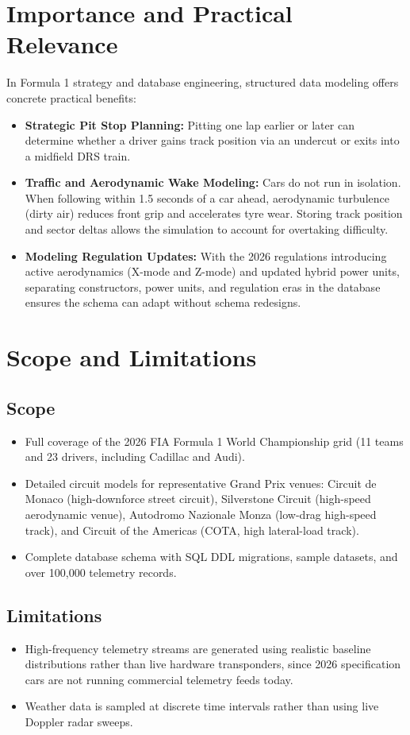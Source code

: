 \documentclass[12pt,a4paper]{report}
\begin{document}
\section{Importance and Practical Relevance}
In Formula 1 strategy and database engineering, structured data modeling offers concrete practical benefits:
\begin{itemize}
    \item \textbf{Strategic Pit Stop Planning:} Pitting one lap earlier or later can determine whether a driver gains track position via an undercut or exits into a midfield DRS train.
    \item \textbf{Traffic and Aerodynamic Wake Modeling:} Cars do not run in isolation. When following within 1.5 seconds of a car ahead, aerodynamic turbulence (dirty air) reduces front grip and accelerates tyre wear. Storing track position and sector deltas allows the simulation to account for overtaking difficulty.
    \item \textbf{Modeling Regulation Updates:} With the 2026 regulations introducing active aerodynamics (X-mode and Z-mode) and updated hybrid power units, separating constructors, power units, and regulation eras in the database ensures the schema can adapt without schema redesigns.
\end{itemize}

\section{Scope and Limitations}
\subsection{Scope}
\begin{itemize}
    \item Full coverage of the 2026 FIA Formula 1 World Championship grid (11 teams and 23 drivers, including Cadillac and Audi).
    \item Detailed circuit models for representative Grand Prix venues: Circuit de Monaco (high-downforce street circuit), Silverstone Circuit (high-speed aerodynamic venue), Autodromo Nazionale Monza (low-drag high-speed track), and Circuit of the Americas (COTA, high lateral-load track).
    \item Complete database schema with SQL DDL migrations, sample datasets, and over 100,000 telemetry records.
\end{itemize}

\subsection{Limitations}
\begin{itemize}
    \item High-frequency telemetry streams are generated using realistic baseline distributions rather than live hardware transponders, since 2026 specification cars are not running commercial telemetry feeds today.
    \item Weather data is sampled at discrete time intervals rather than using live Doppler radar sweeps.
\end{itemize}
\end{document}
